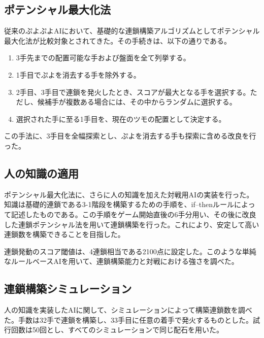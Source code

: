 \documentclass[twocolumn, a4paper]{UECIEresume}
\begin{document}
\subsection{ポテンシャル最大化法}
従来のぷよぷよAIにおいて、基礎的な連鎖構築アルゴリズムとしてポテンシャル最大化法が比較対象とされてきた\cite{puyo_monte, puyo_temp}。その手続きは、以下の通りである。
\begin{enumerate}
\item 3手先までの配置可能な手および盤面を全て列挙する。
\item 1手目でぷよを消去する手を除外する。
\item 2手目、3手目で連鎖を発火したとき、スコアが最大となる手を選択する。ただし、候補手が複数ある場合には、その中からランダムに選択する。
\item 選択された手に至る1手目を、現在のツモの配置として決定する。
\end{enumerate}

この手法に、3手目を全幅探索とし、ぷよを消去する手も探索に含める改良を行った。

\subsection{人の知識の適用}
ポテンシャル最大化法に、さらに人の知識を加えた対戦用AIの実装を行った。知識は基礎的連鎖である3-1階段を構築するための手順を、if--thenルールによって記述したものである。この手順をゲーム開始直後の6手分用い、その後に改良した連鎖ポテンシャル法を用いて連鎖構築を行った。これにより、安定して高い連鎖数を構築できることを目指した。

連鎖発動のスコア閾値は、4連鎖相当である2100点に設定した。このような単純なルールベースAIを用いて、連鎖構築能力と対戦における強さを調べた。

\subsection{連鎖構築シミュレーション}
人の知識を実装したAIに関して、シミュレーションによって構築連鎖数を調べた。手数は32手で連鎖を構築し、33手目に任意の着手で発火するものとした。試行回数は50回とし、すべてのシミュレーションで同じ配石を用いた。
\end{document}
